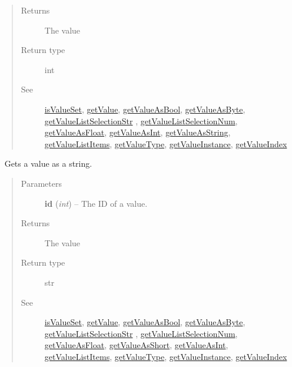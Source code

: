\documentclass[letterpaper,10pt,english]{sphinxmanual}
\begin{document}
\begin{fulllineitems}
\begin{fulllineitems}
\begin{quote}
\begin{description}
\item[{Returns}] \leavevmode
The value

\item[{Return type}] \leavevmode
int

\item[{See}] \leavevmode
{\hyperref[libopenzwave:isvalueset]{isValueSet}}, {\hyperref[libopenzwave:getvalue]{getValue}}, {\hyperref[libopenzwave:getvalueasbool]{getValueAsBool}}, {\hyperref[libopenzwave:getvalueasbyte]{getValueAsByte}}, {\hyperref[libopenzwave:getvaluelistselectionstr]{getValueListSelectionStr}} , {\hyperref[libopenzwave:getvaluelistselectionnum]{getValueListSelectionNum}}, {\hyperref[libopenzwave:getvalueasfloat]{getValueAsFloat}}, {\hyperref[libopenzwave:getvalueasint]{getValueAsInt}}, {\hyperref[libopenzwave:getvalueasstring]{getValueAsString}}, {\hyperref[libopenzwave:getvaluelistitems]{getValueListItems}}, {\hyperref[libopenzwave:getvaluetype]{getValueType}}, {\hyperref[libopenzwave:getvalueinstance]{getValueInstance}}, {\hyperref[libopenzwave:getvalueindex]{getValueIndex}}

\end{description}\end{quote}

\end{fulllineitems}


\begin{fulllineitems}
\label{libopenzwave:libopenzwave.PyManager.getValueAsString}~\label{libopenzwave:getvalueasstring}
Gets a value as a string.
\begin{quote}\begin{description}
\item[{Parameters}] \leavevmode
\textbf{id} (\emph{int}) -- The ID of a value.

\item[{Returns}] \leavevmode
The value

\item[{Return type}] \leavevmode
str

\item[{See}] \leavevmode
{\hyperref[libopenzwave:isvalueset]{isValueSet}}, {\hyperref[libopenzwave:getvalue]{getValue}}, {\hyperref[libopenzwave:getvalueasbool]{getValueAsBool}}, {\hyperref[libopenzwave:getvalueasbyte]{getValueAsByte}}, {\hyperref[libopenzwave:getvaluelistselectionstr]{getValueListSelectionStr}} , {\hyperref[libopenzwave:getvaluelistselectionnum]{getValueListSelectionNum}}, {\hyperref[libopenzwave:getvalueasfloat]{getValueAsFloat}}, {\hyperref[libopenzwave:getvalueasshort]{getValueAsShort}}, {\hyperref[libopenzwave:getvalueasint]{getValueAsInt}}, {\hyperref[libopenzwave:getvaluelistitems]{getValueListItems}}, {\hyperref[libopenzwave:getvaluetype]{getValueType}}, {\hyperref[libopenzwave:getvalueinstance]{getValueInstance}}, {\hyperref[libopenzwave:getvalueindex]{getValueIndex}}


\end{description}
\end{quote}
\end{fulllineitems}
\end{fulllineitems}
\end{document}
